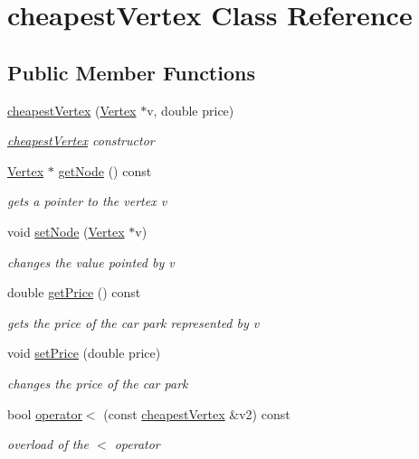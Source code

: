 \hypertarget{classcheapest_vertex}{}\section{cheapest\+Vertex Class Reference}
\label{classcheapest_vertex}
\subsection*{Public Member Functions}
\begin{DoxyCompactItemize}
\item 
\hyperlink{classcheapest_vertex_aeeb883f2da756be42b775dd19c2afbbb}{cheapest\+Vertex} (\hyperlink{class_vertex}{Vertex} $\ast$v, double price)
\begin{DoxyCompactList}\small\item\em \hyperlink{classcheapest_vertex}{cheapest\+Vertex} constructor \end{DoxyCompactList}\item 
\hyperlink{class_vertex}{Vertex} $\ast$ \hyperlink{classcheapest_vertex_a65a0aef884d80b9d11bd8ce90a337e2b}{get\+Node} () const
\begin{DoxyCompactList}\small\item\em gets a pointer to the vertex v \end{DoxyCompactList}\item 
void \hyperlink{classcheapest_vertex_a28cc5cafd2972d7b4095e0d251688128}{set\+Node} (\hyperlink{class_vertex}{Vertex} $\ast$v)
\begin{DoxyCompactList}\small\item\em changes the value pointed by v \end{DoxyCompactList}\item 
double \hyperlink{classcheapest_vertex_a770ec67eadb07e548e15b396440bbc3a}{get\+Price} () const
\begin{DoxyCompactList}\small\item\em gets the price of the car park represented by v \end{DoxyCompactList}\item 
void \hyperlink{classcheapest_vertex_ae8868f73f3bf298959e61fa667553c9e}{set\+Price} (double price)
\begin{DoxyCompactList}\small\item\em changes the price of the car park \end{DoxyCompactList}\item 
bool \hyperlink{classcheapest_vertex_af3cad9d9f57eae9dee7119465185e5af}{operator$<$} (const \hyperlink{classcheapest_vertex}{cheapest\+Vertex} \&v2) const
\begin{DoxyCompactList}\small\item\em overload of the $<$ operator \end{DoxyCompactList}\end{DoxyCompactItemize}


